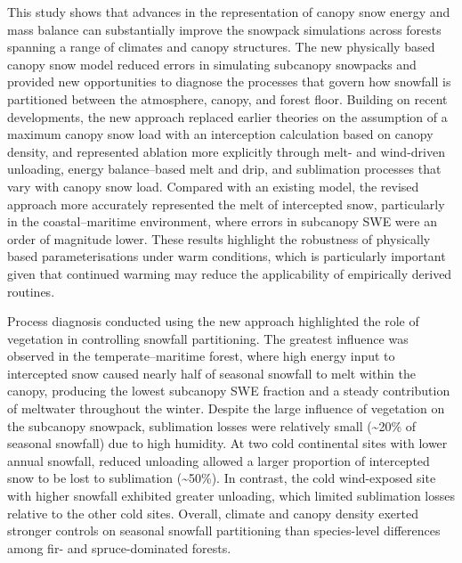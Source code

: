 \documentclass[
  letterpaper,
]{tex/uofsthesis-cs}
\begin{document}
This study shows that advances in the representation of canopy snow
energy and mass balance can substantially improve the snowpack
simulations across forests spanning a range of climates and canopy
structures. The new physically based canopy snow model reduced errors in
simulating subcanopy snowpacks and provided new opportunities to
diagnose the processes that govern how snowfall is partitioned between
the atmosphere, canopy, and forest floor. Building on recent
developments, the new approach replaced earlier theories on the
assumption of a maximum canopy snow load with an interception
calculation based on canopy density, and represented ablation more
explicitly through melt- and wind-driven unloading, energy
balance--based melt and drip, and sublimation processes that vary with
canopy snow load. Compared with an existing model, the revised approach
more accurately represented the melt of intercepted snow, particularly
in the coastal--maritime environment, where errors in subcanopy SWE were
an order of magnitude lower. These results highlight the robustness of
physically based parameterisations under warm conditions, which is
particularly important given that continued warming may reduce the
applicability of empirically derived routines.

Process diagnosis conducted using the new approach highlighted the role
of vegetation in controlling snowfall partitioning. The greatest
influence was observed in the temperate--maritime forest, where high
energy input to intercepted snow caused nearly half of seasonal snowfall
to melt within the canopy, producing the lowest subcanopy SWE fraction
and a steady contribution of meltwater throughout the winter. Despite
the large influence of vegetation on the subcanopy snowpack, sublimation
losses were relatively small (\textasciitilde20\% of seasonal snowfall)
due to high humidity. At two cold continental sites with lower annual
snowfall, reduced unloading allowed a larger proportion of intercepted
snow to be lost to sublimation (\textasciitilde50\%). In contrast, the
cold wind-exposed site with higher snowfall exhibited greater unloading,
which limited sublimation losses relative to the other cold sites.
Overall, climate and canopy density exerted stronger controls on
seasonal snowfall partitioning than species-level differences among fir-
and spruce-dominated forests.
\end{document}
